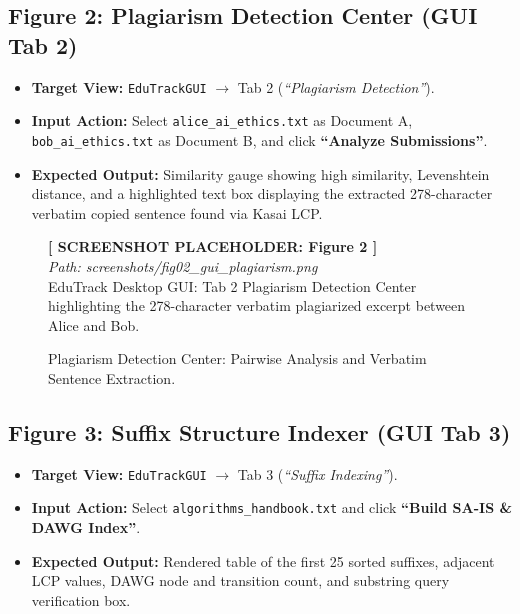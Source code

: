 \subsection{Figure 2: Plagiarism Detection Center (GUI Tab 2)}
\begin{itemize}
    \item \textbf{Target View:} \texttt{EduTrackGUI} $\to$ Tab 2 (\textit{``Plagiarism Detection''}).
    \item \textbf{Input Action:} Select \texttt{alice\_ai\_ethics.txt} as Document A, \texttt{bob\_ai\_ethics.txt} as Document B, and click \textbf{``Analyze Submissions''}.
    \item \textbf{Expected Output:} Similarity gauge showing high similarity, Levenshtein distance, and a highlighted text box displaying the extracted 278-character verbatim copied sentence found via Kasai LCP.
\end{itemize}

\begin{figure}[H]
\centering
\begin{tcolorbox}[colback=white,colframe=codegray,width=0.92\textwidth,halign=center]
\vspace{0.8cm}
\textbf{[ SCREENSHOT PLACEHOLDER: Figure 2 ]}\\
\textit{Path: screenshots/fig02_gui_plagiarism.png}\\
\small EduTrack Desktop GUI: Tab 2 Plagiarism Detection Center highlighting the 278-character verbatim plagiarized excerpt between Alice and Bob.
\vspace{0.8cm}
\end{tcolorbox}
\caption{Plagiarism Detection Center: Pairwise Analysis and Verbatim Sentence Extraction.}
\label{fig:ss_plagiarism}
\end{figure}

\subsection{Figure 3: Suffix Structure Indexer (GUI Tab 3)}
\begin{itemize}
    \item \textbf{Target View:} \texttt{EduTrackGUI} $\to$ Tab 3 (\textit{``Suffix Indexing''}).
    \item \textbf{Input Action:} Select \texttt{algorithms\_handbook.txt} and click \textbf{``Build SA-IS \& DAWG Index''}.
    \item \textbf{Expected Output:} Rendered table of the first 25 sorted suffixes, adjacent LCP values, DAWG node and transition count, and substring query verification box.
\end{itemize}

